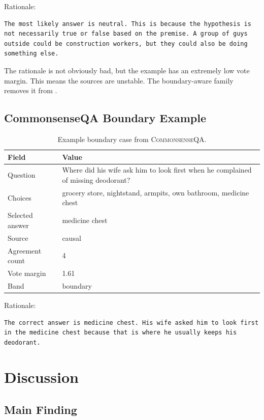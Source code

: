 \documentclass[11pt]{article}
\DeclareRobustCommand{\code}[1]{\texttt{\detokenize{#1}}}
\newcommand{\dataset}[1]{\textsc{#1}}
\begin{document}
Rationale:
\begin{lstlisting}
The most likely answer is neutral. This is because the hypothesis is not necessarily true or false based on the premise. A group of guys outside could be construction workers, but they could also be doing something else.
\end{lstlisting}

The rationale is not obviously bad, but the example has an extremely low vote margin. This means the sources are unstable. The boundary-aware family removes it from \code{boundary_mix}.

\subsection{CommonsenseQA Boundary Example}

\begin{table}[H]
\centering
\caption{Example boundary case from \dataset{CommonsenseQA}.}
\begin{tabularx}{\linewidth}{lX}
\toprule
Field & Value \\
\midrule
Question & Where did his wife ask him to look first when he complained of missing deodorant? \\
Choices & grocery store, nightstand, armpits, own bathroom, medicine chest \\
Selected answer & medicine chest \\
Source & causal \\
Agreement count & 4 \\
Vote margin & 1.61 \\
Band & boundary \\
\bottomrule
\end{tabularx}
\end{table}

Rationale:
\begin{lstlisting}
The correct answer is medicine chest. His wife asked him to look first in the medicine chest because that is where he usually keeps his deodorant.
\end{lstlisting}

\section{Discussion}

\subsection{Main Finding}
\end{document}
